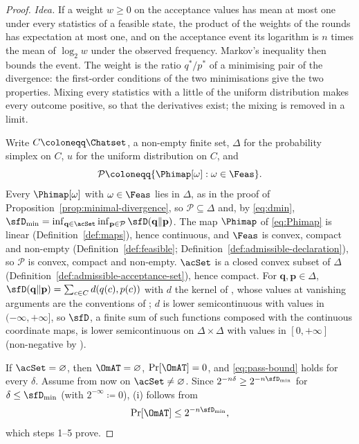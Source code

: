\begin{proof}
\emph{Idea.} If a weight $w\ge0$ on the acceptance values has mean at most
one under every statistics of a feasible state, the product of the weights
of the rounds has expectation at most one, and on the acceptance event its
logarithm is $n$ times the mean of $\log_2w$ under the observed frequency.
Markov's inequality then bounds the event. The weight is the ratio
$q^{*}/p^{*}$ of a minimising pair of the divergence: the first-order
conditions of the two minimisations give the two properties. Mixing every
statistics with a little of the uniform distribution makes every outcome
positive, so that the derivatives exist; the mixing is removed in a limit.

Write $C\coloneqq\Chatset$, a non-empty finite set, $\Delta$ for the
probability simplex on $C$, $u$ for the uniform distribution on $C$, and
\begin{equation*}
  \mathcal{P}\coloneqq\{\Phimap[\omega]:\omega\in\Feas\}.
\end{equation*}
Every $\Phimap[\omega]$ with $\omega\in\Feas$ lies in $\Delta$, as in the
proof of Proposition~\ref{prop:minimal-divergence}, so $\mathcal{P}\subseteq\Delta$
and, by \eqref{eq:dmin},
$\sfD_{\min}=\inf_{\mathbf q\in\acSet}\inf_{\mathbf p\in\mathcal{P}}
\sfD(\mathbf q\|\mathbf p)$. The map $\Phimap$ of \eqref{eq:Phimap} is
linear (Definition~\ref{def:maps}), hence continuous, and $\Feas$ is convex,
compact and non-empty (Definition~\ref{def:feasible};
Definition~\ref{def:admissible-declaration}), so $\mathcal{P}$ is convex,
compact and non-empty. $\acSet$ is a closed convex subset of $\Delta$
(Definition~\ref{def:admissible-acceptance-set}), hence compact. For
$\mathbf q,\mathbf p\in\Delta$,
$\sfD(\mathbf q\|\mathbf p)=\sum_{c\in C}d(q(c),p(c))$ with $d$ the kernel
of , whose values at vanishing arguments are the
conventions of ; $d$ is lower semicontinuous with values in
$(-\infty,+\infty]$, so $\sfD$, a finite sum of such functions composed with
the continuous coordinate maps, is lower semicontinuous on $\Delta\times\Delta$ with values in
$[0,+\infty]$ (non-negative by ).

If $\acSet=\varnothing$, then $\OmAT=\varnothing$, $\Pr[\OmAT]=0$, and
\eqref{eq:pass-bound} holds for every $\delta$. Assume from now on
$\acSet\ne\varnothing$. Since $2^{-n\delta}\ge2^{-n\sfD_{\min}}$ for $\delta\le\sfD_{\min}$
(with $2^{-\infty}\coloneqq0$), (i) follows from
\begin{equation}\label{eq:pass-bound-dmin}
  \Pr[\OmAT]\le2^{-n\sfD_{\min}} ,
\end{equation}
which steps 1--5 prove.


\end{proof}
